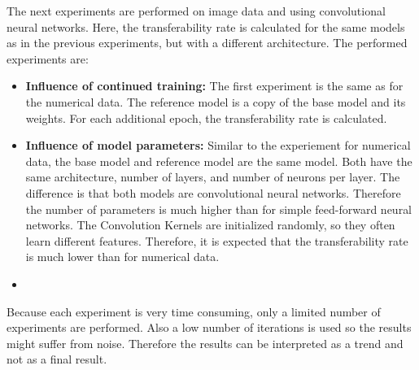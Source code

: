 \documentclass{article}
\begin{document}
The next experiments are performed on image data and using convolutional neural networks. Here, the transferability rate is calculated for the same models as in the previous experiments, but with a different architecture. The performed experiments are:
\begin{itemize}
    \item \textbf{Influence of continued training:} The first experiment is the same as for the numerical data. The reference model is a copy of the base model and its weights. For each additional epoch, the transferability rate is calculated. 
    \item \textbf{Influence of model parameters:} Similar to the experiement for numerical data, the base model and reference model are the same model. Both have the same architecture, number of layers, and number of neurons per layer. The difference is that both models are convolutional neural networks. Therefore the number of parameters is much higher than for simple feed-forward neural networks. The Convolution Kernels are initialized randomly, so they often learn different features. Therefore, it is expected that the transferability rate is much lower than for numerical data.\item 
\end{itemize} 
Because each experiment is very time consuming, only a limited number of experiments are performed. Also a low number of iterations is used so the results might suffer from noise. Therefore the results can be interpreted as a trend and not as a final result. 
\end{document}
